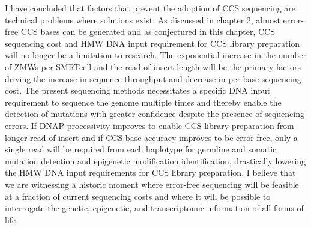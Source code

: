 I have concluded that factors that prevent the adoption of CCS sequencing are technical problems where solutions exist. As discussed in chapter 2, almost error-free CCS bases can be generated and as conjectured in this chapter, CCS sequencing cost and HMW DNA input requirement for CCS library preparation will no longer be a limitation to research. The exponential increase in the number of ZMWs per SMRTcell and the read-of-insert length will be the primary factors driving the increase in sequence throughput and decrease in per-base sequencing cost. The present sequencing methods necessitates a specific DNA input requirement to sequence the genome multiple times and thereby enable the detection of mutations with greater confidence despite the presence of sequencing errors. If DNAP processivity improves to enable CCS library preparation from longer read-of-insert and if CCS base accuracy improves to be error-free, only a single read will be required from each haplotype for germline and somatic mutation detection and epigenetic modification identification, drastically lowering the HMW DNA input requirements for CCS library preparation. I believe that we are witnessing a historic moment where error-free sequencing will be feasible at a fraction of current sequencing costs and where it will be possible to interrogate the genetic, epigenetic, and transcriptomic information of all forms of life.  









